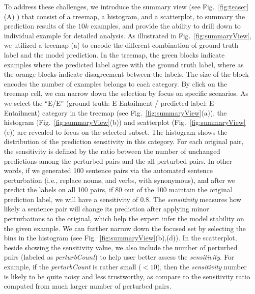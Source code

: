 To address these challenges, we introduce the summary view (see Fig.~\ref{fig:teaser}(A) ) that consist of a treemap, a histogram, and a scatterplot, to summary the prediction results of the $10k$ examples, and provide the ability to drill down to individual example for detailed analysis.
As illustrated in Fig.~\ref{fig:summaryView}, we utilized a treemap (a) to encode the different combination of ground truth label and the model prediction. In the treemap, the green blocks indicate examples where the predicted label agree with the ground truth label, where as the orange blocks indicate disagreement between the labels. The size of the block encodes the number of examples belongs to each category.
%
By click on the treemap cell, we can narrow down the selection by focus on specific scenarios.
%
As we select the ``E/E'' (ground truth: E-Entailment / predicted label: E-Entailment) category in the treemap (see Fig.~\ref{fig:summaryView}(a)), the histogram (Fig.~\ref{fig:summaryView}(b)) and scatterplot  (Fig.~\ref{fig:summaryView}(c)) are revealed to focus on the selected subset. The histogram shows the distribution of the prediction sensitivity in this category. For each original pair, the sensitivity is defined by the ratio between the number of unchanged predictions among the perturbed pairs and the all perturbed pairs. In other words, if we generated 100 sentence pairs via the automated sentence perturbation (i.e., replace nouns, and verbs, with synonymous), and after we predict the labels on all 100 pairs, if 80 out of the 100 maintain the original prediction label, we will have a sensitivity of 0.8. The \emph{sensitivity} measures how likely a sentence pair will change its prediction after applying minor perturbations to the original, which help the expert infer the model stability on the given example.
%
We can further narrow down the focused set by selecting the bins in the histogram (see Fig.~\ref{fig:summaryView}(b),(d)). 
%
In the scatterplot, beside showing the sensitivity value, we also include the number of perturbed pairs (labeled as \emph{perturbCount}) to help user better assess the \emph{sensitivity}. For example, if the \emph{perturbCount} is rather small ($<10$), then the \emph{sensitivity} number is likely to be quite noisy and less trustworthy, as compare to the sensitivity ratio computed from much larger number of perturbed pairs.

